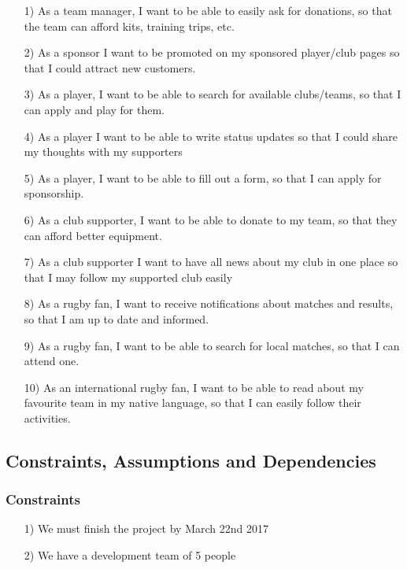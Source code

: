 \documentclass[10pt,a4paper]{article}
\begin{document}
\begin{itemize}
\item[1)]
As a team manager,
I want to be able to easily ask for donations,
so that the team can afford kits, training trips, etc.

\item[2)]
As a sponsor
I want to be promoted on my sponsored player/club pages
so that I could attract new customers.

\item[3)]
As a player,
I want to be able to search for available clubs/teams,
so that I can apply and play for them.

\item[4)]
As a player
I want to be able to write status updates
so that I could share my thoughts with my supporters

\item[5)]
As a player,
I want to be able to fill out a form,
so that I can apply for sponsorship.

\item[6)]
As a club supporter,
I want to be able to donate to my team,
so that they can afford better equipment.

\item[7)]
As a club supporter
I want to have all news about my club in one place
so that I may follow my supported club easily

\item[8)]
As a rugby fan,
I want to receive notifications about matches and results,
so that I am up to date and informed.

\item[9)]
As a rugby fan,
I want to be able to search for local matches,
so that I can attend one.

\item[10)]
As an international rugby fan,
I want to be able to read about my favourite team in my native language,
so that I can easily follow their activities.

\end{itemize}

\subsection{Constraints, Assumptions and Dependencies}

\subsubsection*{Constraints}
\begin{itemize}
\item[1)]
We must finish the project by March 22nd 2017

\item[2)]
We have a development team of 5 people
\end{itemize}
\end{document}
